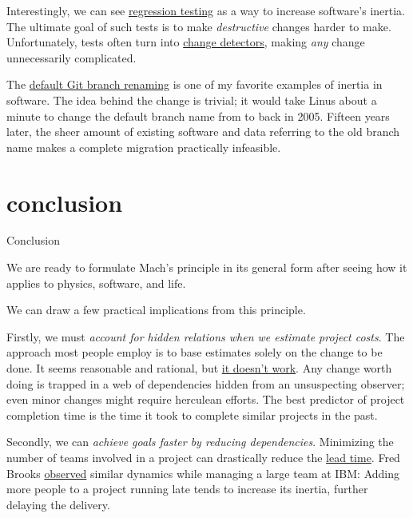 \documentclass{article}
\begin{document}
Interestingly, we can see \href{https://en.wikipedia.org/wiki/Regression_testing}{regression testing} as a way to increase software's inertia.
The ultimate goal of such tests is to make \emph{destructive} changes harder to make.
Unfortunately, tests often turn into \href{https://testing.googleblog.com/2015/01/testing-on-toilet-change-detector-tests.html}{change detectors}, making \emph{any} change unnecessarily complicated.

The \href{https://github.com/github/renaming}{default Git branch renaming} is one of my favorite examples of inertia in software.
The idea behind the change is trivial; it would take Linus about a minute to change the default branch name from  to  back in 2005.
Fifteen years later, the sheer amount of existing software and data referring to the old branch name makes a complete migration practically infeasible.

\section{conclusion}{Conclusion}

We are ready to formulate Mach's principle in its general form after seeing how it applies to physics, software, and life.


We can draw a few practical implications from this principle.

Firstly, we must \emph{account for hidden relations when we estimate project costs}.
The approach most people employ is to base estimates solely on the change to be done.
It seems reasonable and rational, but \href{https://en.wikipedia.org/wiki/Planning_fallacy}{it doesn't work}.
Any change worth doing is trapped in a web of dependencies hidden from an unsuspecting observer; even minor changes might require herculean efforts.
The best predictor of project completion time is the time it took to complete similar projects in the past.

Secondly, we can \emph{achieve goals faster by reducing dependencies}.
Minimizing the number of teams involved in a project can drastically reduce the \href{https://www.investopedia.com/terms/l/leadtime.asp}{lead time}.
Fred Brooks \href{https://en.wikipedia.org/wiki/The_Mythical_Man-Month}{observed} similar dynamics while managing a large team at IBM:
Adding more people to a project running late tends to increase its inertia, further delaying the delivery.
\end{document}
